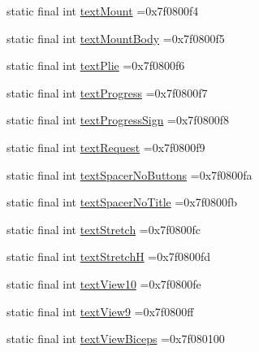 \begin{DoxyCompactItemize}
\item 
static final int \mbox{\hyperlink{classcom_1_1example_1_1trainawearapplication_1_1_r_1_1id_a2a161306526947c8ddeb237800ab0c33}{text\+Mount}} =0x7f0800f4
\item 
static final int \mbox{\hyperlink{classcom_1_1example_1_1trainawearapplication_1_1_r_1_1id_ae2b1b2c0c47583e4b2fe1380507485d3}{text\+Mount\+Body}} =0x7f0800f5
\item 
static final int \mbox{\hyperlink{classcom_1_1example_1_1trainawearapplication_1_1_r_1_1id_a85649f07d0fe0e0e5c80ff118d2c643e}{text\+Plie}} =0x7f0800f6
\item 
static final int \mbox{\hyperlink{classcom_1_1example_1_1trainawearapplication_1_1_r_1_1id_a976176eba3717e341c051da671d6a8d6}{text\+Progress}} =0x7f0800f7
\item 
static final int \mbox{\hyperlink{classcom_1_1example_1_1trainawearapplication_1_1_r_1_1id_a82250a87af600038c9d22255a31c468c}{text\+Progress\+Sign}} =0x7f0800f8
\item 
static final int \mbox{\hyperlink{classcom_1_1example_1_1trainawearapplication_1_1_r_1_1id_ad3ca292be8717ef68136ed97bb823ca6}{text\+Request}} =0x7f0800f9
\item 
static final int \mbox{\hyperlink{classcom_1_1example_1_1trainawearapplication_1_1_r_1_1id_a5a1499325e7e114be3bb71f25a2a6d48}{text\+Spacer\+No\+Buttons}} =0x7f0800fa
\item 
static final int \mbox{\hyperlink{classcom_1_1example_1_1trainawearapplication_1_1_r_1_1id_a91480878c14d9d4a25fa2bc980aeaebd}{text\+Spacer\+No\+Title}} =0x7f0800fb
\item 
static final int \mbox{\hyperlink{classcom_1_1example_1_1trainawearapplication_1_1_r_1_1id_ac57fa9d61c5956ebbcf1bc9d2921c8d1}{text\+Stretch}} =0x7f0800fc
\item 
static final int \mbox{\hyperlink{classcom_1_1example_1_1trainawearapplication_1_1_r_1_1id_aa14fd28b26f02222e5cfe02b3389a314}{text\+StretchH}} =0x7f0800fd
\item 
static final int \mbox{\hyperlink{classcom_1_1example_1_1trainawearapplication_1_1_r_1_1id_aedd05315fb20c41d4788deb90966885f}{text\+View10}} =0x7f0800fe
\item 
static final int \mbox{\hyperlink{classcom_1_1example_1_1trainawearapplication_1_1_r_1_1id_a38ed59eaff3cbe870585236a033a628c}{text\+View9}} =0x7f0800ff
\item 
static final int \mbox{\hyperlink{classcom_1_1example_1_1trainawearapplication_1_1_r_1_1id_acd152498f313b64111a8f071086e598c}{text\+View\+Biceps}} =0x7f080100

\end{DoxyCompactItemize}

